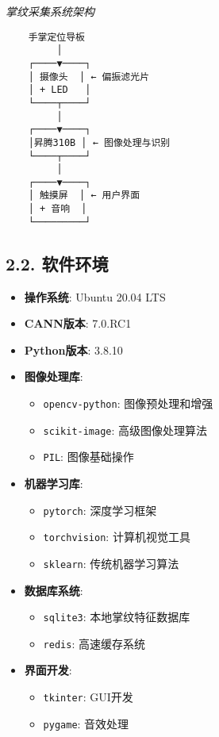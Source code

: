 \emph{掌纹采集系统架构}

\begin{lstlisting}
    手掌定位导板
         │
    ┌────▼────┐
    │ 摄像头  │ ← 偏振滤光片
    │ + LED   │
    └────┬────┘
         │
    ┌────▼────┐
    │昇腾310B │ ← 图像处理与识别
    └────┬────┘
         │
    ┌────▼────┐
    │ 触摸屏  │ ← 用户界面
    │ + 音响  │
    └─────────┘
\end{lstlisting}

\subsection{2.2. 软件环境}\label{ux8f6fux4ef6ux73afux5883}

\begin{itemize}
\tightlist
\item
  \textbf{操作系统}: Ubuntu 20.04 LTS
\item
  \textbf{CANN版本}: 7.0.RC1
\item
  \textbf{Python版本}: 3.8.10
\item
  \textbf{图像处理库}:

  \begin{itemize}
  \tightlist
  \item
    \passthrough{\lstinline!opencv-python!}: 图像预处理和增强
  \item
    \passthrough{\lstinline!scikit-image!}: 高级图像处理算法
  \item
    \passthrough{\lstinline!PIL!}: 图像基础操作
  \end{itemize}
\item
  \textbf{机器学习库}:

  \begin{itemize}
  \tightlist
  \item
    \passthrough{\lstinline!pytorch!}: 深度学习框架
  \item
    \passthrough{\lstinline!torchvision!}: 计算机视觉工具
  \item
    \passthrough{\lstinline!sklearn!}: 传统机器学习算法
  \end{itemize}
\item
  \textbf{数据库系统}:

  \begin{itemize}
  \tightlist
  \item
    \passthrough{\lstinline!sqlite3!}: 本地掌纹特征数据库
  \item
    \passthrough{\lstinline!redis!}: 高速缓存系统
  \end{itemize}
\item
  \textbf{界面开发}:

  \begin{itemize}
  \tightlist
  \item
    \passthrough{\lstinline!tkinter!}: GUI开发
  \item
    \passthrough{\lstinline!pygame!}: 音效处理
  \end{itemize}
\end{itemize}

